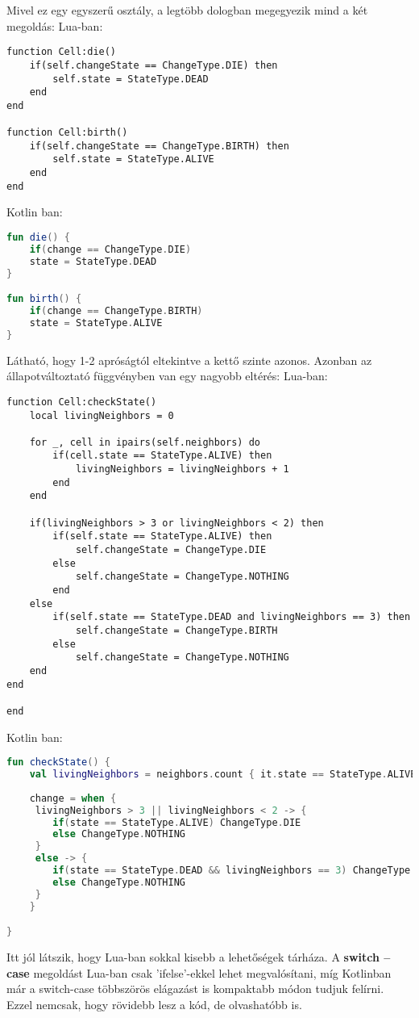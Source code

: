 Mivel ez egy egyszerű osztály, a legtöbb dologban megegyezik mind a két megoldás:
Lua-ban:
\scriptsize
\begin{lstlisting}[style=Lua]
function Cell:die()
	if(self.changeState == ChangeType.DIE) then
		self.state = StateType.DEAD
	end
end

function Cell:birth()
	if(self.changeState == ChangeType.BIRTH) then
		self.state = StateType.ALIVE
	end
end
\end{lstlisting}
\normalsize
Kotlin ban:
\scriptsize
\begin{lstlisting}[language = Kotlin]
fun die() {
	if(change == ChangeType.DIE)
	state = StateType.DEAD
}

fun birth() {
	if(change == ChangeType.BIRTH)
	state = StateType.ALIVE
}
\end{lstlisting}
\normalsize
Látható, hogy 1-2 apróságtól eltekintve a kettő szinte azonos. Azonban az állapotváltoztató függvényben van egy nagyobb eltérés:
Lua-ban:
\scriptsize
\begin{lstlisting}[style=Lua]
function Cell:checkState()
	local livingNeighbors = 0
	
	for _, cell in ipairs(self.neighbors) do
		if(cell.state == StateType.ALIVE) then
			livingNeighbors = livingNeighbors + 1
		end
	end
	
	if(livingNeighbors > 3 or livingNeighbors < 2) then
		if(self.state == StateType.ALIVE) then
			self.changeState = ChangeType.DIE
		else
			self.changeState = ChangeType.NOTHING
		end
	else
		if(self.state == StateType.DEAD and livingNeighbors == 3) then
			self.changeState = ChangeType.BIRTH
		else
			self.changeState = ChangeType.NOTHING
	end
end

end
\end{lstlisting}
\normalsize
Kotlin ban:
\scriptsize
\begin{lstlisting}[language = Kotlin]
fun checkState() {
	val livingNeighbors = neighbors.count { it.state == StateType.ALIVE }
	
	change = when {
	 livingNeighbors > 3 || livingNeighbors < 2 -> {
		if(state == StateType.ALIVE) ChangeType.DIE
		else ChangeType.NOTHING
	 }
	 else -> {
		if(state == StateType.DEAD && livingNeighbors == 3) ChangeType.BIRTH
		else ChangeType.NOTHING
	 }
	}

}
\end{lstlisting}
\normalsize
Itt jól látszik, hogy Lua-ban sokkal kisebb a lehetőségek tárháza. A \textbf{switch -- case} megoldást Lua-ban csak 'ifelse'-ekkel lehet megvalósítani, míg Kotlinban már a switch-case többszörös elágazást is kompaktabb módon tudjuk felírni. Ezzel nemcsak, hogy rövidebb lesz a kód, de olvashatóbb is.

